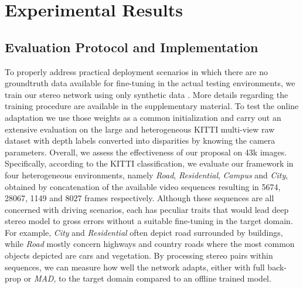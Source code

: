 \documentclass[10pt,twocolumn,letterpaper]{article}
\newcommand{\matteoscomments}[1]{ \color{blue} #1 \color{black}}
\def\netname{\emph{MADNet}}
\def\algoname{\emph{MAD}}
\def\kitti{KITTI}
\begin{document}
\section{Experimental Results}
\label{sec:results}

\subsection{Evaluation Protocol and Implementation}
\label{ssec:protocol}

To properly address practical deployment scenarios in which there are no groundtruth data available for fine-tuning in the actual testing environments, we train our stereo network using only synthetic data \cite{mayer2016large}. More details regarding the training procedure are available in the supplementary material. 
To test the online adaptation we use those weights as a common initialization and carry out an extensive evaluation on the large and heterogeneous \kitti{} multi-view raw dataset \cite{KITTI_RAW} with depth labels \cite{Uhrig2017THREEDV} converted into disparities by knowing the camera parameters. Overall, we assess the effectiveness of our proposal on 43k images. Specifically, according to the \kitti{} classification, we evaluate our framework in four heterogeneous environments, namely \emph{Road}, \emph{Residential}, \emph{Campus} and \emph{City}, obtained by concatenation of the available video sequences resulting in 5674, 28067, 1149 and 8027 frames respectively. Although these sequences are all concerned with driving scenarios, each has peculiar traits that would lead deep stereo model to gross errors without a suitable fine-tuning in the target domain. For example, \emph{City} and \emph{Residential} often depict road surrounded by buildings, while \emph{Road} mostly concern highways and country roads where the most common objects depicted are cars and vegetation. By processing stereo pairs within sequences, we can measure how well the network adapts, either with full back-prop or \algoname{}, to the target domain compared to an offline trained model.
\end{document}
